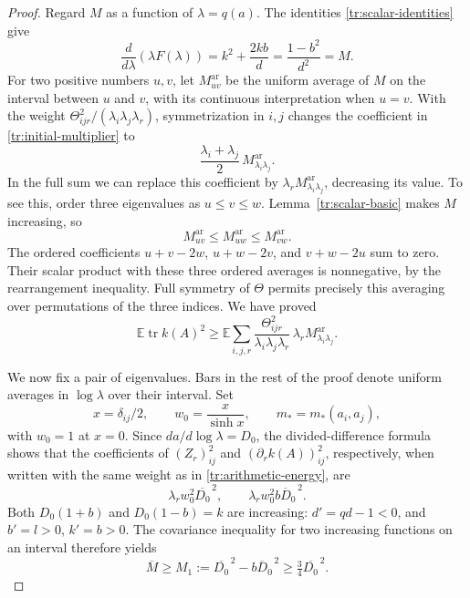 \documentclass[11pt]{article}
\theoremstyle{definition}
\theoremstyle{remark}
\numberwithin{equation}{section}
\begin{document}
\begin{proof}
Regard $M$ as a function of $\lambda=q(a)$.  The identities
\eqref{tr:scalar-identities} give
\begin{equation}\label{tr:lambdaF}
 \frac{d}{d\lambda}(\lambda F(\lambda))
 =k^2+\frac{2kb}{d}
 =\frac{1-b^2}{d^2}=M.
\end{equation}
For two positive numbers $u,v$, let $M^{\mathrm{ar}}_{uv}$ be the
uniform average of $M$ on the interval between $u$ and $v$, with its
continuous interpretation when $u=v$.  With the weight
$\Theta_{ijr}^2/(\lambda_i\lambda_j\lambda_r)$, symmetrization in
$i,j$ changes the coefficient in \eqref{tr:initial-multiplier} to
\[
 \frac{\lambda_i+\lambda_j}{2}\,
 M^{\mathrm{ar}}_{\lambda_i\lambda_j}.
\]
In the full sum we can replace this coefficient by
$\lambda_rM^{\mathrm{ar}}_{\lambda_i\lambda_j}$, decreasing its
value.  To see this, order three eigenvalues as $u\le v\le w$.
Lemma~\ref{tr:scalar-basic} makes $M$ increasing, so
\[
 M^{\mathrm{ar}}_{uv}\le M^{\mathrm{ar}}_{uw}
                         \le M^{\mathrm{ar}}_{vw}.
\]
The ordered coefficients $u+v-2w$, $u+w-2v$, and $v+w-2u$ sum to
zero.  Their scalar product with these three ordered averages is
nonnegative, by the rearrangement inequality.  Full symmetry of
$\Theta$ permits precisely this averaging over permutations of the
three indices.  We have proved
\begin{equation}\label{tr:arithmetic-energy}
 \mathbb E\operatorname{tr}k(A)^2
 \ge\mathbb E\sum_{i,j,r}
 \frac{\Theta_{ijr}^2}{\lambda_i\lambda_j\lambda_r}\,
 \lambda_r M^{\mathrm{ar}}_{\lambda_i\lambda_j}.
\end{equation}

We now fix a pair of eigenvalues.  Bars in the rest of the proof denote
uniform averages in $\log\lambda$ over their interval.  Set
\[
 x=\delta_{ij}/2,\qquad w_0=\frac{x}{\sinh x},\qquad m_*=m_*(a_i,a_j),
\]
with $w_0=1$ at $x=0$.  Since $da/d\log\lambda=D_0$,
the divided-difference formula shows that the coefficients of
$(Z_r)_{ij}^2$ and $(\partial_r k(A))_{ij}^2$, respectively, when
written with the same weight as in \eqref{tr:arithmetic-energy}, are
\begin{equation}\label{tr:derivative-coefficients}
 \lambda_r w_0^2\overline{D_0}^{\,2},\qquad
 \lambda_r w_0^2\overline{bD_0}^{\,2}.
\end{equation}
Both $D_0(1+b)$ and $D_0(1-b)=k$ are increasing: $d'=qd-1<0$,
and $b'=l>0$, $k'=b>0$.  The covariance inequality for two increasing
functions on an interval therefore yields
\begin{equation}\label{tr:logarithmic-chebyshev}
 \overline M\ge
 M_1:=\overline{D_0}^{\,2}-\overline{bD_0}^{\,2}
 \ge\tfrac34\overline{D_0}^{\,2}.
\end{equation}


\end{proof}
\end{document}
